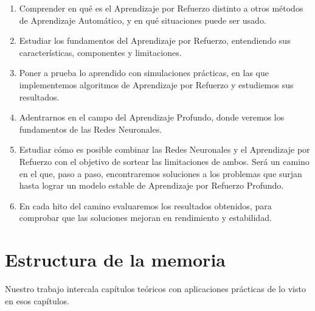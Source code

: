 \begin{enumerate}
    \item Comprender en qué es el Aprendizaje por Refuerzo distinto a otros métodos de Aprendizaje Automático, y en qué situaciones puede ser usado.
    \item Estudiar los fundamentos del Aprendizaje por Refuerzo, entendiendo sus características, componentes y limitaciones.
    \item Poner a prueba lo aprendido con simulaciones prácticas, en las que implementemos algoritmos de Aprendizaje por Refuerzo y estudiemos sus resultados.
    \item Adentrarnos en el campo del Aprendizaje Profundo, donde veremos los fundamentos de las Redes Neuronales.
    \item Estudiar cómo es posible combinar las Redes Neuronales y el Aprendizaje por Refuerzo con el objetivo de sortear las limitaciones de ambos. Será un camino en el que, paso a paso, encontraremos soluciones a los problemas que surjan hasta lograr un modelo estable de Aprendizaje por Refuerzo Profundo.
    \item En cada hito del camino evaluaremos los resultados obtenidos, para comprobar que las soluciones mejoran en rendimiento y estabilidad.
\end{enumerate}


\section{Estructura de la memoria}

Nuestro trabajo intercala capítulos teóricos con aplicaciones prácticas de lo visto en esos capítulos.

